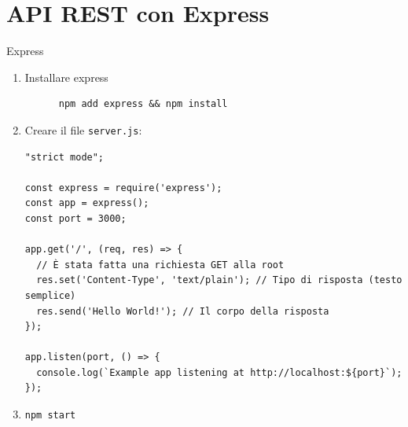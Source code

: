 \section[Express]{API REST con Express}
\begin{frame}[fragile]{Express}\transfade\centering
  \begin{enumerate}
    \item Installare express
    \begin{verbatim}
      npm add express && npm install
    \end{verbatim}
    \item Creare il file \texttt{server.js}:
    \begin{verbatim}
"strict mode";

const express = require('express');
const app = express();
const port = 3000;

app.get('/', (req, res) => {
  // È stata fatta una richiesta GET alla root
  res.set('Content-Type', 'text/plain'); // Tipo di risposta (testo semplice)
  res.send('Hello World!'); // Il corpo della risposta
});

app.listen(port, () => {
  console.log(`Example app listening at http://localhost:${port}`);
});
    \end{verbatim}
    \item \texttt{npm start}
  \end{enumerate}
\end{frame}

